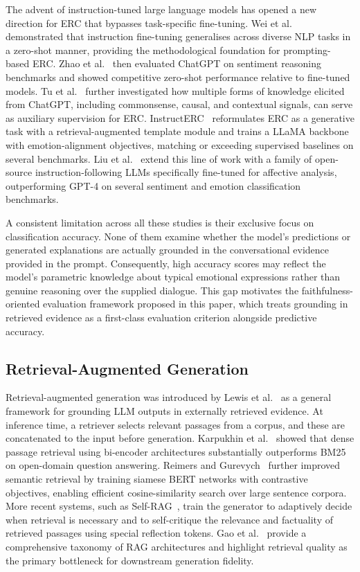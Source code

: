 \documentclass[runningheads]{llncs}
\begin{document}
The advent of instruction-tuned large language models has opened a new
direction for ERC that bypasses task-specific fine-tuning.
Wei et al.~\cite{wei2022flan} demonstrated that instruction fine-tuning
generalises across diverse NLP tasks in a zero-shot manner, providing the
methodological foundation for prompting-based ERC.
Zhao et al.~\cite{zhao2023chatgpt} then evaluated ChatGPT on sentiment
reasoning benchmarks and showed competitive zero-shot performance relative
to fine-tuned models. Tu et al.~\cite{tu2023chatgpt} further investigated
how multiple forms of knowledge elicited from ChatGPT, including
commonsense, causal, and contextual signals, can serve as auxiliary
supervision for ERC. InstructERC~\cite{wang2023instructerc} reformulates
ERC as a generative task with a retrieval-augmented template module and
trains a LLaMA backbone with emotion-alignment objectives, matching
or exceeding supervised baselines on several benchmarks. Liu et
al.~\cite{liu2024emollms} extend this line of work with a family of
open-source instruction-following LLMs specifically fine-tuned for
affective analysis, outperforming GPT-4 on several sentiment and emotion
classification benchmarks.

A consistent limitation across all these studies is their exclusive focus
on classification accuracy. None of them examine whether the model's
predictions or generated explanations are actually grounded in the
conversational evidence provided in the prompt. Consequently, high
accuracy scores may reflect the model's parametric knowledge about typical
emotional expressions rather than genuine reasoning over the supplied
dialogue. This gap motivates the faithfulness-oriented evaluation
framework proposed in this paper, which treats grounding in retrieved evidence as a first-class
evaluation criterion alongside predictive accuracy.

\subsection{Retrieval-Augmented Generation}

Retrieval-augmented generation was introduced by Lewis et
al.~\cite{lewis2020rag} as a general framework for grounding LLM outputs
in externally retrieved evidence. At inference time, a retriever selects
relevant passages from a corpus, and these are concatenated to the input
before generation. Karpukhin et al.~\cite{karpukhin2020dpr} showed that
dense passage retrieval using bi-encoder architectures substantially
outperforms BM25~\cite{robertson2009bm25} on open-domain question
answering. Reimers and Gurevych~\cite{reimers2019sbert} further improved
semantic retrieval by training siamese BERT networks with contrastive
objectives, enabling efficient cosine-similarity search over large
sentence corpora. More recent systems, such as Self-RAG~\cite{asai2024selfrag},
train the generator to adaptively decide when retrieval is necessary and
to self-critique the relevance and factuality of retrieved passages using
special reflection tokens. Gao et al.~\cite{gao2023survey} provide a
comprehensive taxonomy of RAG architectures and highlight retrieval quality
as the primary bottleneck for downstream generation fidelity.
\end{document}
